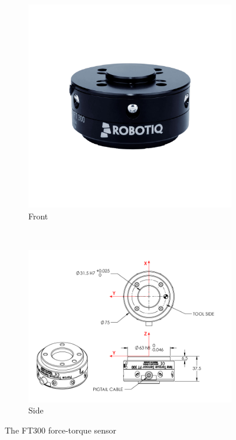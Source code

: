 \documentclass[times, utf8, diplomski, english]{fer}
\begin{document}
\begin{figure}[h,t!]
    \centering
        \begin{subfigure}[t]{0.34\textwidth}
        \includegraphics[clip, trim=0cm 5cm 0cm 5cm, width=\textwidth]{FT300_pic}
        \caption{Front}
    \end{subfigure}
    ~
    \begin{subfigure}[t]{0.34\textwidth}
        \includegraphics[width=\textwidth]{FT300}
        \caption{Side}
    \end{subfigure}
    \caption{The FT300 force-torque sensor}\label{fig:FT300}
\end{figure}
\end{document}
